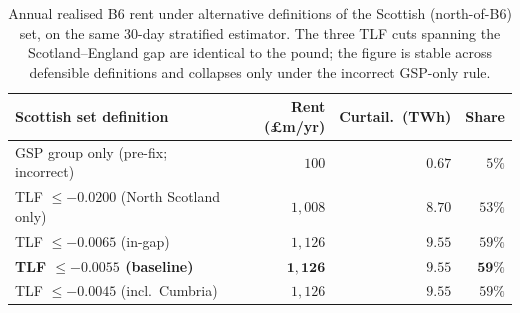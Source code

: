 \documentclass[review,3p,times]{elsarticle}
\theoremstyle{plain}
\theoremstyle{definition}
\begin{document}
\begin{table}[h]
\centering
\caption{Annual realised B6 rent under alternative definitions of the Scottish
(north-of-B6) set, on the same 30-day stratified estimator. The three TLF cuts
spanning the Scotland--England gap are identical to the pound; the figure is
stable across defensible definitions and collapses only under the incorrect
GSP-only rule.}
\label{tab:classif}
\begin{tabular}{lrrr}
\toprule
Scottish set definition & Rent (\pounds m/yr) & Curtail.\ (TWh) & Share\\
\midrule
GSP group only (pre-fix; incorrect) & $100$ & $0.67$ & $5\%$\\
TLF $\le-0.0200$ (North Scotland only) & $1{,}008$ & $8.70$ & $53\%$\\
TLF $\le-0.0065$ (in-gap) & $1{,}126$ & $9.55$ & $59\%$\\
\textbf{TLF $\le-0.0055$ (baseline)} & $\mathbf{1{,}126}$ & $\mathbf{9.55}$ & $\mathbf{59\%}$\\
TLF $\le-0.0045$ (incl.\ Cumbria) & $1{,}126$ & $9.55$ & $59\%$\\
\bottomrule
\end{tabular}
\end{table}



\end{document}
